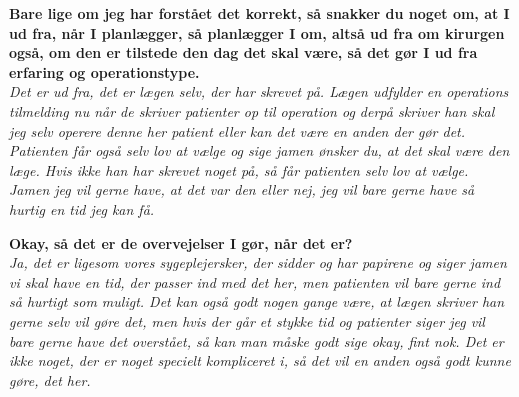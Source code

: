 \textbf{Bare lige om jeg har forstået det korrekt, så snakker du noget om, at I ud fra, når I planlægger, så planlægger I om, altså ud fra om kirurgen også, om den er tilstede den dag det skal være, så det gør I ud fra erfaring og operationstype.}\\
\noindent
\textit{Det er ud fra, det er lægen selv, der har skrevet på. Lægen udfylder en operations tilmelding nu når de skriver patienter op til operation og derpå skriver han skal jeg selv operere denne her patient eller kan det være en anden der gør det. Patienten får også selv lov at vælge og sige jamen ønsker du, at det skal være den læge. Hvis ikke han har skrevet noget på, så får patienten selv lov at vælge. Jamen jeg vil gerne have, at det var den eller nej, jeg vil bare gerne have så hurtig en tid jeg kan få.}


\textbf{Okay, så det er de overvejelser I gør, når det er?}\\
\noindent
\textit{Ja, det er ligesom vores sygeplejersker, der sidder og har papirene og siger jamen vi skal have en tid, der passer ind med det her, men patienten vil bare gerne ind så hurtigt som muligt. Det kan også godt nogen gange være, at lægen skriver han gerne selv vil gøre det, men hvis der går et stykke tid og patienter siger jeg vil bare gerne have det overstået, så kan man måske godt sige okay, fint nok. Det er ikke noget, der er noget specielt kompliceret i, så det vil en anden også godt kunne gøre, det her.}